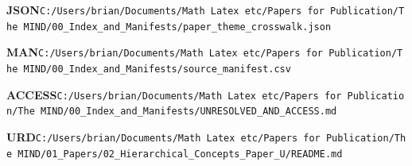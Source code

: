 \documentclass[10pt,letterpaper]{article}
\begin{document}
\noindent\textbf{JSON}\quad \texttt{C:/\allowbreak{}Users/\allowbreak{}brian/\allowbreak{}Documents/\allowbreak{}Math\ Latex\ etc/\allowbreak{}Papers\ for\ Publication/\allowbreak{}The\ MIND/\allowbreak{}00\_\allowbreak{}Index\_\allowbreak{}and\_\allowbreak{}Manifests/\allowbreak{}paper\_\allowbreak{}theme\_\allowbreak{}crosswalk.json}\par
\noindent\textbf{MAN}\quad \texttt{C:/\allowbreak{}Users/\allowbreak{}brian/\allowbreak{}Documents/\allowbreak{}Math\ Latex\ etc/\allowbreak{}Papers\ for\ Publication/\allowbreak{}The\ MIND/\allowbreak{}00\_\allowbreak{}Index\_\allowbreak{}and\_\allowbreak{}Manifests/\allowbreak{}source\_\allowbreak{}manifest.csv}\par
\noindent\textbf{ACCESS}\quad \texttt{C:/\allowbreak{}Users/\allowbreak{}brian/\allowbreak{}Documents/\allowbreak{}Math\ Latex\ etc/\allowbreak{}Papers\ for\ Publication/\allowbreak{}The\ MIND/\allowbreak{}00\_\allowbreak{}Index\_\allowbreak{}and\_\allowbreak{}Manifests/\allowbreak{}UNRESOLVED\_\allowbreak{}AND\_\allowbreak{}ACCESS.md}\par
\noindent\textbf{URD}\quad \texttt{C:/\allowbreak{}Users/\allowbreak{}brian/\allowbreak{}Documents/\allowbreak{}Math\ Latex\ etc/\allowbreak{}Papers\ for\ Publication/\allowbreak{}The\ MIND/\allowbreak{}01\_\allowbreak{}Papers/\allowbreak{}02\_\allowbreak{}Hierarchical\_\allowbreak{}Concepts\_\allowbreak{}Paper\_\allowbreak{}U/\allowbreak{}README.md}\par
\endgroup
\end{document}
